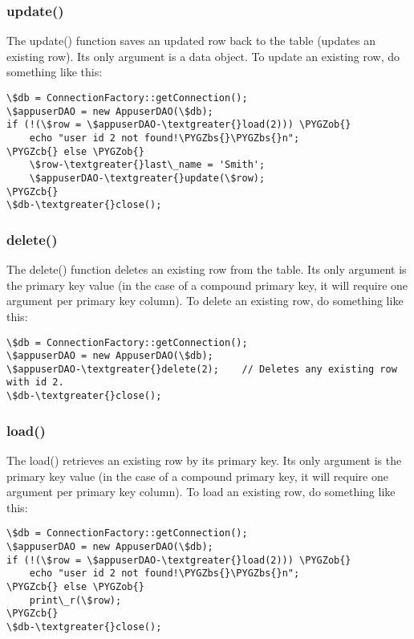 \documentclass[letterpaper,10pt,english]{sphinxmanual}
\def\PYGZbs{\char`\\}
\def\PYGZob{\char`\{}
\def\PYGZcb{\char`\}}
\begin{document}
\subsubsection{update()}
\label{jaxFrameworkGuide:update}
The update() function saves an updated row back to the table (updates an existing row).  Its only
argument is a data object.  To update an existing row, do something like this:

\begin{Verbatim}[commandchars=\\\{\}]
\$db = ConnectionFactory::getConnection();
\$appuserDAO = new AppuserDAO(\$db);
if (!(\$row = \$appuserDAO-\textgreater{}load(2))) \PYGZob{}
    echo "user id 2 not found!\PYGZbs{}\PYGZbs{}n";
\PYGZcb{} else \PYGZob{}
    \$row-\textgreater{}last\_name = 'Smith';
    \$appuserDAO-\textgreater{}update(\$row);
\PYGZcb{}
\$db-\textgreater{}close();
\end{Verbatim}


\subsubsection{delete()}
\label{jaxFrameworkGuide:delete}
The delete() function deletes an existing row from the table.  Its only argument is the primary key
value (in the case of a compound primary key, it will require one argument per primary key column).
To delete an existing row, do something like this:

\begin{Verbatim}[commandchars=\\\{\}]
\$db = ConnectionFactory::getConnection();
\$appuserDAO = new AppuserDAO(\$db);
\$appuserDAO-\textgreater{}delete(2);    // Deletes any existing row with id 2.
\$db-\textgreater{}close();
\end{Verbatim}


\subsubsection{load()}
\label{jaxFrameworkGuide:load}
The load() retrieves an existing row by its primary key.  Its only argument is the primary key value
(in the case of a compound primary key, it will require one argument per primary key column).
To load an existing row, do something like this:

\begin{Verbatim}[commandchars=\\\{\}]
\$db = ConnectionFactory::getConnection();
\$appuserDAO = new AppuserDAO(\$db);
if (!(\$row = \$appuserDAO-\textgreater{}load(2))) \PYGZob{}
    echo "user id 2 not found!\PYGZbs{}\PYGZbs{}n";
\PYGZcb{} else \PYGZob{}
    print\_r(\$row);
\PYGZcb{}
\$db-\textgreater{}close();
\end{Verbatim}
\end{document}
